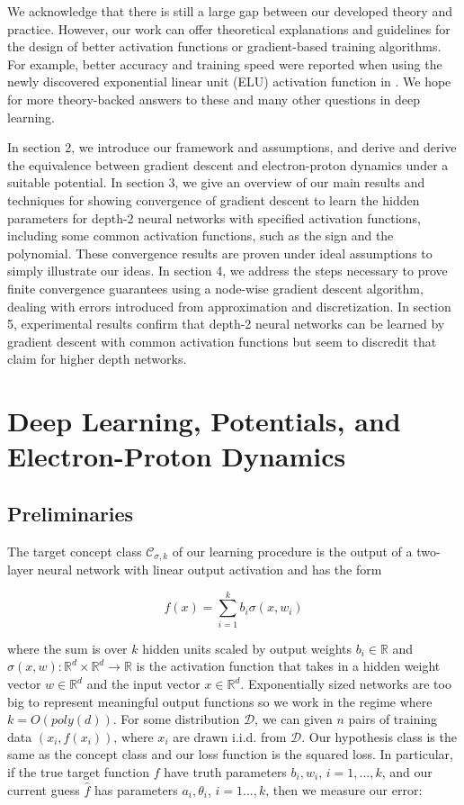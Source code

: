 \documentclass[11pt]{article}
\newcommand{\R}{{\mathbb{R}}}
\begin{document}
We acknowledge that there is still a large gap between our developed theory and practice. However, our work can offer theoretical explanations and guidelines for the design of better activation functions or gradient-based training algorithms. For example, better accuracy and training speed were reported when using the newly discovered exponential linear unit (ELU) activation function in \cite{ClevertUH15} \cite{ShahKSS16}. We hope for more theory-backed answers to these and many other questions in deep learning.

In section 2, we introduce our framework and assumptions, and derive and derive the equivalence between gradient descent and electron-proton dynamics under a suitable potential. In section 3, we give an overview of our main results and techniques for showing convergence of gradient descent to learn the hidden parameters for depth-2 neural networks with specified activation functions, including some common activation functions, such as the sign and the polynomial. These convergence results are proven under ideal assumptions to simply illustrate our ideas. In section 4, we address the steps necessary to prove finite convergence guarantees using a node-wise gradient descent algorithm, dealing with errors introduced from approximation and discretization. In section 5, experimental results confirm that depth-2 neural networks can be learned by gradient descent with common activation functions but seem to discredit that claim for higher depth networks.  
 

\section{Deep Learning, Potentials, and Electron-Proton Dynamics}

\subsection{Preliminaries}

The target concept class $\mathcal{C}_{\sigma,k}$ of our learning procedure is the output of a two-layer neural network with linear output activation and has the form 

\begin{equation}
    f(x) = \sum_{i=1}^k b_i\sigma(x,w_i)
\end{equation}

where the sum is over $k$ hidden units scaled by output weights $b_i \in \R$ and $\sigma(x,w):\R^d \times \R^d\to \R$ is the activation function that takes in a hidden weight vector $w \in \R^d$ and the input vector $x \in \R^d$. Exponentially sized networks are too big to represent meaningful output functions so we work in the regime where $k = O(poly(d))$. For some distribution $\mathcal{D}$, we can given $n$ pairs of training data $(x_i, f(x_i))$, where $x_i$ are drawn i.i.d. from $\mathcal{D}$. Our hypothesis class is the same as the concept class and our loss function is the squared loss. In particular, if the true target function $f$ have truth parameters $b_i, w_i$, $i = 1,...,k$, and our current guess $\widehat{f}$ has parameters $a_i, \theta_i$, $i=1...,k$, then we measure our error:
\end{document}

